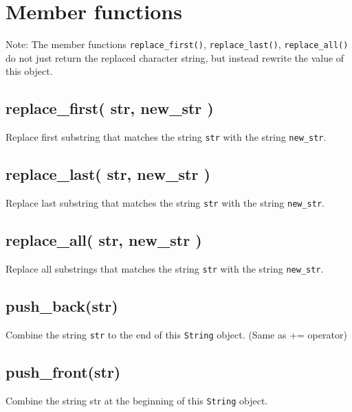 \documentclass[]{book}
\begin{document}
\hypertarget{member-functions-4}{%
\section{Member functions}\label{member-functions-4}}

Note: The member functions \texttt{replace\_first()}, \texttt{replace\_last()}, \texttt{replace\_all()} do not just return the replaced character string, but instead rewrite the value of this object.

\hypertarget{replace_first-str-new_str}{%
\subsection{replace\_first( str, new\_str )}\label{replace_first-str-new_str}}

Replace first substring that matches the string \texttt{str} with the string \texttt{new\_str}.

\hypertarget{replace_last-str-new_str}{%
\subsection{replace\_last( str, new\_str )}\label{replace_last-str-new_str}}

Replace last substring that matches the string \texttt{str} with the string \texttt{new\_str}.

\hypertarget{replace_all-str-new_str}{%
\subsection{replace\_all( str, new\_str )}\label{replace_all-str-new_str}}

Replace all substrings that matches the string \texttt{str} with the string \texttt{new\_str}.

\hypertarget{push_backstr}{%
\subsection{push\_back(str)}\label{push_backstr}}

Combine the string \texttt{str} to the end of this \texttt{String} object. (Same as += operator)

\hypertarget{push_frontstr}{%
\subsection{push\_front(str)}\label{push_frontstr}}

Combine the string str at the beginning of this \texttt{String} object.
\end{document}
